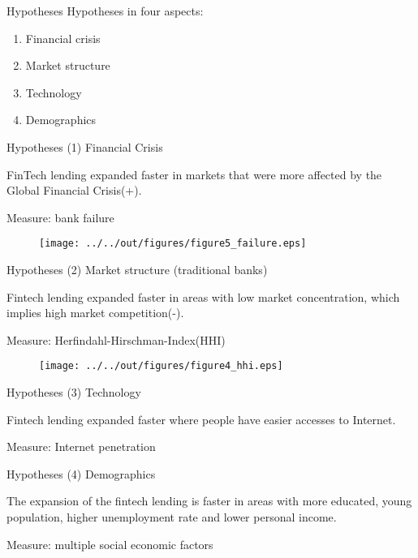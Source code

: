 \documentclass[11pt]{beamer}
\begin{document}
\begin{frame}{Hypotheses}
    Hypotheses in four aspects:
    \begin{enumerate}
        \item Financial crisis
        \item Market structure
        \item Technology
        \item Demographics
    \end{enumerate}
\end{frame}


\begin{frame}{Hypotheses}
    (1) Financial Crisis

    FinTech lending expanded faster in markets that were more affected by the Global Financial Crisis(+). 

    Measure: bank failure

    \begin{figure}
        \texttt{[image: ../../out/figures/figure5\_failure.eps]}
    \end{figure}
\end{frame}


\begin{frame}{Hypotheses}
    (2) Market structure (traditional banks)

    Fintech lending expanded faster in areas with low market concentration, which implies high market competition(-).

    Measure: Herfindahl-Hirschman-Index(HHI)

    \begin{figure}
        \texttt{[image: ../../out/figures/figure4\_hhi.eps]}
    \end{figure}
\end{frame}



\begin{frame}{Hypotheses}
    (3) Technology

    Fintech lending expanded faster where people have easier accesses to Internet. 

    Measure: Internet penetration
\end{frame}


\begin{frame}{Hypotheses}
    (4) Demographics

    The expansion of the fintech lending is faster in areas with more educated, young population, higher unemployment rate and lower personal income. 

    Measure: multiple social economic factors
\end{frame}
\end{document}
